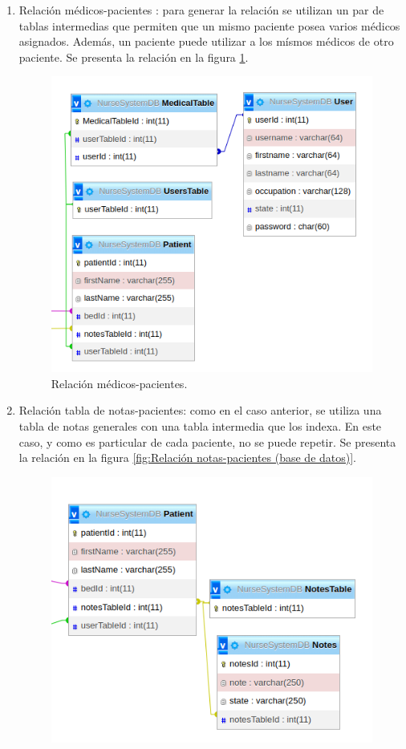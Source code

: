 \begin{enumerate}
\item Relación médicos-pacientes : para generar la relación se utilizan un par de tablas intermedias que permiten que un mismo paciente posea varios médicos asignados. Además, un paciente puede utilizar a los mísmos médicos de otro paciente. Se presenta la relación en la figura \ref{fig:Relación médicos-pacientes}.
\begin{figure}[ht]
	\centering
	\includegraphics[scale=.65]{./Figures/tabla-medicos-pacientes.png}
	\caption{Relación médicos-pacientes.}
	\label{fig:Relación médicos-pacientes}
\end{figure}
\item Relación tabla de notas-pacientes: como en el caso anterior, se utiliza una tabla de notas generales con una tabla intermedia que los indexa. En este caso, y como es particular de cada paciente, no se puede repetir.  Se presenta la relación en la figura \ref{fig:Relación notas-pacientes (base de datos)}.
\begin{figure}[ht]
	\centering
	\includegraphics[scale=.65]{./Figures/patient-notes.png}

\end{figure}
\end{enumerate}
